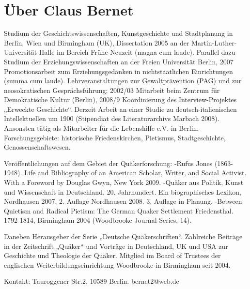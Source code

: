 \chapter{Über Claus Bernet}

Studium der Geschichtswissenschaften, Kunstgeschichte und Stadtplanung in Berlin, Wien und Birmingham (UK), Dissertation 2005 an der Martin-Luther-Universität Halle im Bereich Frühe Neuzeit (magna cum laude). Parallel dazu Studium der Erziehungswissenschaften an der Freien Universität Berlin, 2007 Promotionsarbeit zum Erziehungsgedanken in nichtstaatlichen Einrichtungen (summa cum laude). Lehrveranstaltungen zur Gewaltprävention (PAG) und zur neosokratischen Gesprächsführung; 2002/03 Mitarbeit beim Zentrum für Demokratische Kultur (Berlin), 2008/9 Koordinierung des Interview-Projektes „Erweckte Geschichte“. Derzeit Arbeit an einer Studie zu deutsch-italienischen Intellektuellen um 1900 (Stipendiat des Literaturarchivs Marbach 2008). Ansonsten tätig als Mitarbeiter für die Lebenshilfe e.V. in Berlin.
Forschungsgebiete: historische Friedenskirchen, Pietismus, Stadtgeschichte, Genossenschaftswesen.

Veröffentlichungen auf dem Gebiet der Quäkerforschung:
-Rufus Jones (1863-1948). Life and Bibliography of an American Scholar, Writer, and Social Activist. With a Foreword by Douglas Gwyn, New York 2009.
-Quäker aus Politik, Kunst und Wissenschaft in Deutschland. 20. Jahrhundert. Ein biographisches Lexikon, Nordhausen 2007. 2. Auflage Nordhausen 2008. 3. Auflage in Planung.
-Between Quietism and Radical Pietism: The German Quaker Settlement Friedensthal. 1792-1814, Birmingham 2004 (Woodbrooke Journal Series, 14).

Daneben Herausgeber der Serie „Deutsche Quäkerschriften“. Zahlreiche Beiträge in der Zeitschrift „Quäker“ und Vorträge in Deutschland, UK und USA zur Geschichte und Theologie der Quäker. Mitglied im Board of Trustees der englischen Weiterbildungseinrichtung Woodbrooke in Birmingham seit 2004.


Kontakt: Tauroggener Str.2, 10589 Berlin. bernet2@web.de
